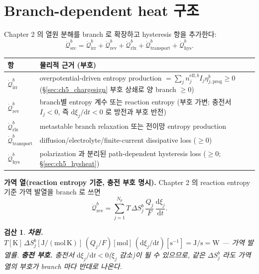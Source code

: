 \documentclass[11pt,a4paper]{article}
\newtheorem*{verifybox}{검산}
\newcommand{\dd}{\mathrm{d}}
\newcommand{\eff}{\mathrm{eff}}
\newcommand{\src}{\mathrm{src}}
\newcommand{\rev}{\mathrm{rev}}
\newcommand{\irr}{\mathrm{irr}}
\newcommand{\rlx}{\mathrm{rlx}}
\newcommand{\transp}{\mathrm{transport}}
\newcommand{\hys}{\mathrm{hys}}
\newcommand{\prog}{\mathrm{prog}}
\begin{document}
\section{Branch-dependent heat 구조}\label{sec:ch5_branchheat}
Chapter 2 의 열원 분해를 branch 로 확장하고 hysteresis 항을 추가한다:
\begin{equation}
\dot{\mathcal Q}_{\src}^b=\dot{\mathcal Q}_{\irr}^b+\dot{\mathcal Q}_{\rev}^b+\dot{\mathcal Q}_{\rlx}^b
+\dot{\mathcal Q}_{\transp}^b+\dot{\mathcal Q}_{\hys}^b.
\label{eq:ch5_branch_heat}
\end{equation}
\begin{longtable}{p{} >{\raggedright\arraybackslash}p{}}
\toprule 항 & 물리적 근거 (부호) \\ \midrule \endhead
$\dot{\mathcal Q}_{\irr}^b$ & overpotential-driven entropy production $=\sum_j n_j^{\eff,b}I_j\eta_{j,\prog}^b\ge0$ (\S\ref{sec:ch5_chargesign} 부호 상쇄로 양 branch $\ge0$) \\
$\dot{\mathcal Q}_{\rev}^b$ & branch별 entropy 계수 또는 reaction entropy (부호 가변; 충전서 $I_j<0$, 즉 $\dd\xi_j/\dd t<0$ 로 방전과 부호 반전) \\
$\dot{\mathcal Q}_{\rlx}^b$ & metastable branch relaxation 또는 전이망 entropy production \\
$\dot{\mathcal Q}_{\transp}^b$ & diffusion/electrolyte/finite-current dissipative loss ($\ge0$) \\
$\dot{\mathcal Q}_{\hys}^b$ & polarization 과 분리된 path-dependent hysteresis loss ($\ge0$; \S\ref{sec:ch5_hysheat}) \\
\bottomrule
\end{longtable}
\textbf{가역 열(reaction entropy 기준, 충전 부호 명시).} Chapter 2 의 reaction entropy 기준 가역 발열을 branch 로
쓰면
\begin{equation}
\dot{\mathcal Q}_{\rev}^b=\sum_{j=1}^{N_p}T\,\Delta S_j^b\,\frac{Q_j}{F}\,\frac{\dd\xi_j}{\dd t}.
\label{eq:ch5_branch_rev}
\end{equation}

\begin{verifybox}
\textbf{차원.} $T[\mathrm K]\,\Delta S_j^b[\mathrm{J/(mol\,K)}]\,(Q_j/F)[\mathrm{mol}]\,(\dd\xi_j/\dd t)[\mathrm{s^{-1}}]
=\mathrm{J/s}=\mathrm W$ — 가역 발열률. \textbf{충전 부호.} 충전서 $\dd\xi_j/\dd t<0$($\xi_j$ 감소)이 될 수 있으므로,
같은 $\Delta S_j^b$ 라도 가역 열의 부호가 branch 마다 반대로 나온다.
\end{verifybox}
\end{document}
